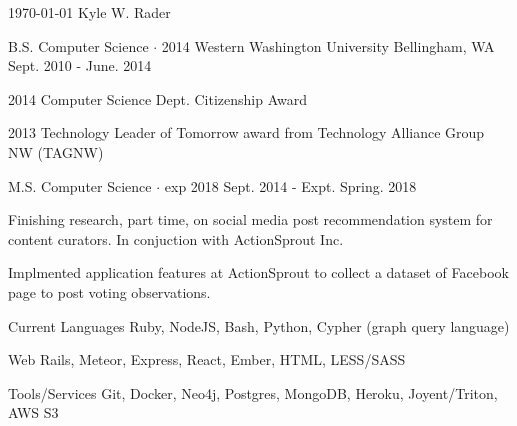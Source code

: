\documentclass[11pt, a4paper]{awesome-cv}
\begin{document}
\makecvheader

\makecvfooter
  {\today}
  {Kyle W. Rader}
  {\thepage}

\begin{cventries}
  \cventry
    {B.S. Computer Science $\cdot$ 2014} %
    {Western Washington University} %
    {Bellingham, WA} %
    {Sept. 2010 - June. 2014} %
    {
      \begin{cvitems} %
        \item {2014 Computer Science Dept. Citizenship Award}
        \item {2013 Technology Leader of Tomorrow award from Technology Alliance Group NW (TAGNW)}
      \end{cvitems}
    }
    {}

  \cventry
    {M.S. Computer Science $\cdot$ exp 2018} %
    { } %
    { } %
    {Sept. 2014 - Expt. Spring. 2018} %
    {
      \begin{cvitems} %
        \item {Finishing research, part time, on social media post recommendation system for content curators. In conjuction with ActionSprout Inc.}
        \item {Implmented application features at ActionSprout to collect a dataset of Facebook page to post voting observations.}
      \end{cvitems}
    }
    {}

\end{cventries}

\begin{cvskills}
  \cvskill
    {Current Languages} %
    {Ruby, NodeJS, Bash, Python, Cypher (graph query language)} %

  \cvskill
    {Web} %
    {Rails, Meteor, Express, React, Ember, HTML, LESS/SASS} %

  \cvskill
    {Tools/Services} %
    {Git, Docker, Neo4j, Postgres, MongoDB, Heroku, Joyent/Triton, AWS S3 } %
\end{cvskills}
\end{document}
